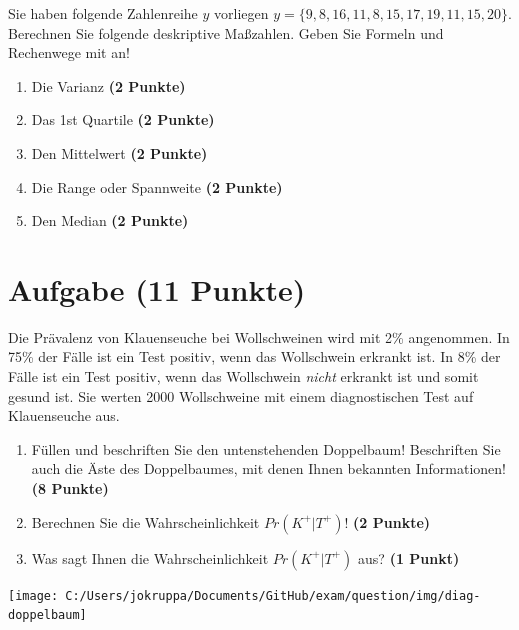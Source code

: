 \documentclass[a4paper, 10pt]{scrartcl}\usepackage[]{graphicx}\usepackage[]{color}
\begin{document}
Sie haben folgende Zahlenreihe $y$ vorliegen
$y = \{9, 8, 16, 11, 8, 15, 17, 19, 11, 15, 20\}$. Berechnen Sie folgende
deskriptive Ma{\ss}zahlen. Geben Sie Formeln und Rechenwege mit an!



\begin{enumerate}
\item Die Varianz \textbf{(2 Punkte)}
\item Das 1st Quartile \textbf{(2 Punkte)}
\item Den Mittelwert \textbf{(2 Punkte)}
\item Die Range oder Spannweite \textbf{(2 Punkte)}
\item Den Median \textbf{(2 Punkte)}
\end{enumerate}
 
\clearpage

\section{Aufgabe \hfill (11 Punkte)}

Die Pr{\"a}valenz von Klauenseuche bei Wollschweinen wird mit
2\% angenommen. In 75\% der F{\"a}lle ist ein Test positiv, wenn das Wollschwein erkrankt
ist. In 8\% der F{\"a}lle ist ein Test positiv,
wenn das Wollschwein \textit{nicht} erkrankt ist und somit gesund ist. Sie
werten 2000 Wollschweine mit einem
diagnostischen Test auf Klauenseuche aus.



\begin{enumerate}
\item F{\"u}llen und beschriften Sie den untenstehenden Doppelbaum! Beschriften
  Sie auch die {\"A}ste des Doppelbaumes, mit denen Ihnen bekannten
  Informationen!  \textbf{(8 Punkte)}
\item Berechnen Sie die Wahrscheinlichkeit $Pr(K^+|T^+)$! \textbf{(2 Punkte)}
\item Was sagt Ihnen die Wahrscheinlichkeit $Pr(K^+|T^+)$ aus? \textbf{(1 Punkt)}
\end{enumerate}

\vspace{1cm}

\begin{center}
  \texttt{[image: C:/Users/jokruppa/Documents/GitHub/exam/question/img/diag-doppelbaum]}
\end{center}
\end{document}
